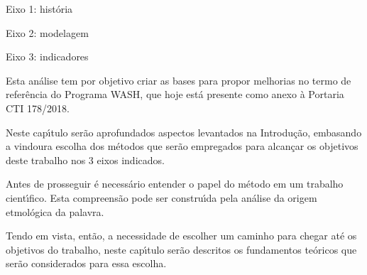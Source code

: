 \documentclass[
12pt,		%
openright,	%
twoside,  %
a4paper,			%
chapter=TITLE,		%
english,			%
french,				%
spanish,			%
brazil				%
]{USPSC-classe/USPSC}
\begin{document}
\begin{alineas}
\item Eixo 1: hist\'oria
\item Eixo 2: modelagem
\item Eixo 3: indicadores
\end{alineas}

Esta an\'alise tem por objetivo criar as bases para propor melhorias no termo de refer\^encia do Programa WASH, que hoje est\'a presente como anexo \`a Portaria CTI 178/2018.









Neste cap\'{\i}tulo ser\~ao aprofundados aspectos levantados na Introdu\c{c}\~ao, embasando a vindoura escolha dos m\'etodos que ser\~ao empregados para alcan\c{c}ar os objetivos deste trabalho nos 3 eixos indicados.









Antes de prosseguir \'e necess\'ario entender o papel do m\'etodo em um trabalho cient\'{\i}fico. Esta compreens\~ao pode ser constru\'{\i}da pela an\'alise da origem etmol\'ogica da palavra.










\noindent\begin{center}\mbox{\centering{}}\end{center}


Tendo em vista, ent\~ao, a necessidade de escolher um caminho para chegar at\'e os objetivos do trabalho, neste cap\'{\i}tulo ser\~ao descritos os fundamentos te\'oricos que ser\~ao considerados para essa escolha.
\end{document}
